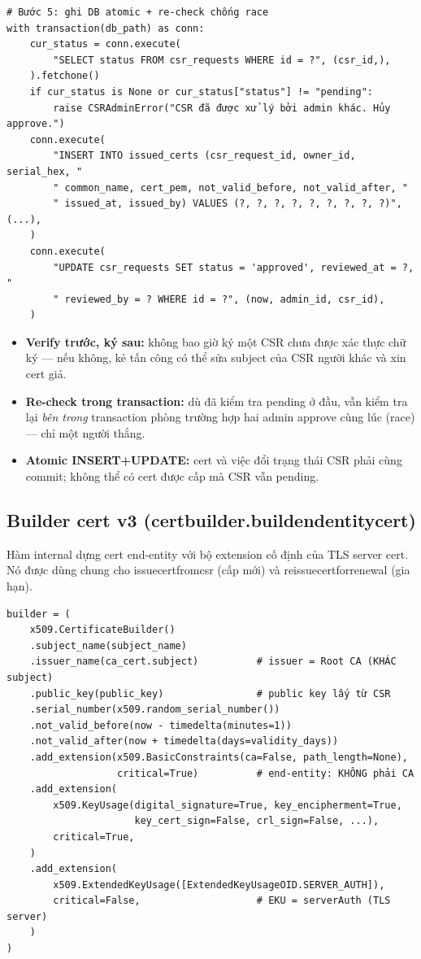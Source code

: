\documentclass[12pt,a4paper]{article}
\newcommand{\code}[1]{{\ttfamily\small\def\_{\textunderscore\discretionary{}{}{}}#1}}
\begin{document}
\begin{Verbatim}
# Bước 5: ghi DB atomic + re-check chống race
with transaction(db_path) as conn:
    cur_status = conn.execute(
        "SELECT status FROM csr_requests WHERE id = ?", (csr_id,),
    ).fetchone()
    if cur_status is None or cur_status["status"] != "pending":
        raise CSRAdminError("CSR đã được xử lý bởi admin khác. Hủy approve.")
    conn.execute(
        "INSERT INTO issued_certs (csr_request_id, owner_id, serial_hex, "
        " common_name, cert_pem, not_valid_before, not_valid_after, "
        " issued_at, issued_by) VALUES (?, ?, ?, ?, ?, ?, ?, ?, ?)", (...),
    )
    conn.execute(
        "UPDATE csr_requests SET status = 'approved', reviewed_at = ?, "
        " reviewed_by = ? WHERE id = ?", (now, admin_id, csr_id),
    )
\end{Verbatim}

\begin{itemize}
  \item \textbf{Verify trước, ký sau:} không bao giờ ký một CSR chưa được xác
        thực chữ ký — nếu không, kẻ tấn công có thể sửa subject của CSR người
        khác và xin cert giả.
  \item \textbf{Re-check trong transaction:} dù đã kiểm tra \code{pending} ở
        đầu, vẫn kiểm tra lại \emph{bên trong} transaction phòng trường hợp hai
        admin approve cùng lúc (race) — chỉ một người thắng.
  \item \textbf{Atomic INSERT+UPDATE:} cert và việc đổi trạng thái CSR phải cùng
        commit; không thể có cert được cấp mà CSR vẫn \code{pending}.
\end{itemize}

\subsection{Builder cert v3 (\code{cert\_builder.\_build\_end\_entity\_cert})}

Hàm internal dựng cert end-entity với bộ extension cố định của TLS server cert.
Nó được dùng chung cho \code{issue\_cert\_from\_csr} (cấp mới) và
\code{reissue\_cert\_for\_renewal} (gia hạn).

\begin{Verbatim}
builder = (
    x509.CertificateBuilder()
    .subject_name(subject_name)
    .issuer_name(ca_cert.subject)          # issuer = Root CA (KHÁC subject)
    .public_key(public_key)                # public key lấy từ CSR
    .serial_number(x509.random_serial_number())
    .not_valid_before(now - timedelta(minutes=1))
    .not_valid_after(now + timedelta(days=validity_days))
    .add_extension(x509.BasicConstraints(ca=False, path_length=None),
                   critical=True)          # end-entity: KHÔNG phải CA
    .add_extension(
        x509.KeyUsage(digital_signature=True, key_encipherment=True,
                      key_cert_sign=False, crl_sign=False, ...),
        critical=True,
    )
    .add_extension(
        x509.ExtendedKeyUsage([ExtendedKeyUsageOID.SERVER_AUTH]),
        critical=False,                    # EKU = serverAuth (TLS server)
    )
)
\end{Verbatim}
\end{document}
